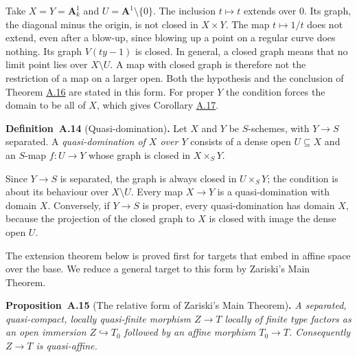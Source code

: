 \documentclass[11pt]{article}
\newenvironment{bpstatement}[2]{\par\addvspace{0.6\baselineskip}\noindent\textbf{#1}#2\textbf{.}\enspace\ignorespaces}
  {\par\addvspace{0.4\baselineskip}}
\newenvironment{bpstatementit}[2]{\begin{bpstatement}{#1}{#2}\itshape\ignorespaces}{\end{bpstatement}}
\begin{document}
Take \(X=Y=\mathbf A^1_k\) and \(U=\mathbf A^1\setminus\{0\}\). The inclusion \(t\mapsto t\) extends over \(0\). Its graph, the diagonal minus the origin, is not closed in \(X\times Y\). The map \(t\mapsto1/t\) does not extend, even after a blow-up, since blowing up a point on a regular curve does nothing. Its graph \(V(ty-1)\) is closed. In general, a closed graph means that no limit point lies over \(X\setminus U\). A map with closed graph is therefore not the restriction of a map on a larger open. Both the hypothesis and the conclusion of Theorem \hyperref[bp41]{A.16} are stated in this form. For proper \(Y\) the condition forces the domain to be all of \(X\), which gives Corollary \hyperref[bp43]{A.17}.

\label{bp36}%
\begin{bpstatement}{Definition~A.14}{ (Quasi-domination)}
Let \(X\) and \(Y\) be \(S\)-schemes, with \(Y\to S\) separated. A \emph{quasi-domination of \(X\) over \(Y\)} consists of a dense open \(U\subseteq X\) and an \(S\)-map \(f:U\to Y\) whose graph is closed in \(X\times_SY\).
\end{bpstatement}

\label{bp37}%
Since \(Y\to S\) is separated, the graph is always closed in \(U\times_SY\); the condition is about its behaviour over \(X\setminus U\). Every map \(X\to Y\) is a quasi-domination with domain \(X\). Conversely, if \(Y\to S\) is proper, every quasi-domination has domain \(X\), because the projection of the closed graph to \(X\) is closed with image the dense open \(U\).

The extension theorem below is proved first for targets that embed in affine space over the base. We reduce a general target to this form by Zariski's Main Theorem.

\label{bp38}%
\begin{bpstatementit}{Proposition~A.15}{ (The relative form of Zariski's Main Theorem)}
A separated, quasi-compact, locally quasi-finite morphism \(Z\to T\) locally of finite type factors as an open immersion \(Z\hookrightarrow T_0\) followed by an affine morphism \(T_0\to T\). Consequently \(Z\to T\) is quasi-affine.
\end{bpstatementit}
\end{document}
